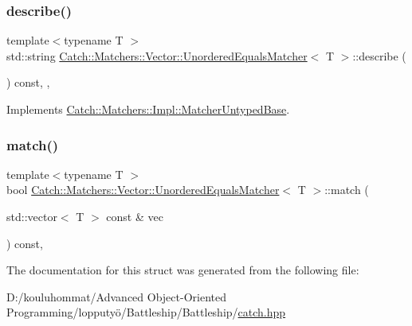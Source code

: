 \subsubsection{\texorpdfstring{describe()}{describe()}}
{\footnotesize\ttfamily template$<$typename T $>$ \\
std\+::string \mbox{\hyperlink{struct_catch_1_1_matchers_1_1_vector_1_1_unordered_equals_matcher}{Catch\+::\+Matchers\+::\+Vector\+::\+Unordered\+Equals\+Matcher}}$<$ T $>$\+::describe (\begin{DoxyParamCaption}{ }\end{DoxyParamCaption}) const\hspace{0.3cm}{\ttfamily [inline]}, {\ttfamily [override]}, {\ttfamily [virtual]}}



Implements \mbox{\hyperlink{class_catch_1_1_matchers_1_1_impl_1_1_matcher_untyped_base_a91d3a907dbfcbb596077df24f6e11fe2}{Catch\+::\+Matchers\+::\+Impl\+::\+Matcher\+Untyped\+Base}}.

\mbox{\label{struct_catch_1_1_matchers_1_1_vector_1_1_unordered_equals_matcher_a3ccdd9dd2cd8bdbb8bb121acbb9cb358}} 
\subsubsection{\texorpdfstring{match()}{match()}}
{\footnotesize\ttfamily template$<$typename T $>$ \\
bool \mbox{\hyperlink{struct_catch_1_1_matchers_1_1_vector_1_1_unordered_equals_matcher}{Catch\+::\+Matchers\+::\+Vector\+::\+Unordered\+Equals\+Matcher}}$<$ T $>$\+::match (\begin{DoxyParamCaption}\item[{std\+::vector$<$ T $>$ const \&}]{vec }\end{DoxyParamCaption}) const\hspace{0.3cm}{\ttfamily [inline]}, {\ttfamily [override]}}



The documentation for this struct was generated from the following file\+:\begin{DoxyCompactItemize}
\item 
D\+:/kouluhommat/\+Advanced Object-\/\+Oriented Programming/lopputyö/\+Battleship/\+Battleship/\mbox{\hyperlink{catch_8hpp}{catch.\+hpp}}\end{DoxyCompactItemize}
